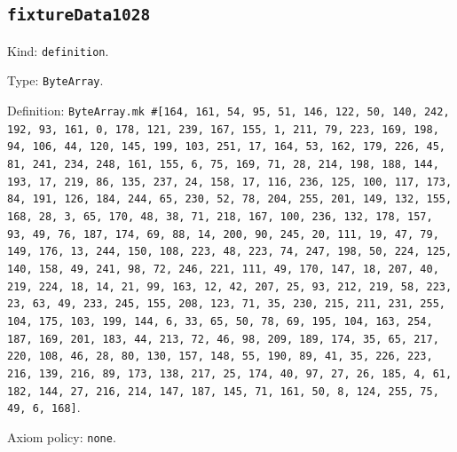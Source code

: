 \documentclass[11pt]{article}
\begin{document}
\subsection*{\texttt{fixtureData1028}}
\noindent Kind: \texttt{definition}.\par
\noindent Type: \texttt{ByteArray}.\par
\noindent Definition: \texttt{ByteArray.mk \#[164, 161, 54, 95, 51, 146, 122, 50, 140, 242, 192, 93, 161, 0, 178, 121, 239, 167, 155, 1, 211, 79, 223, 169, 198, 94, 106, 44, 120, 145, 199, 103, 251, 17, 164, 53, 162, 179, 226, 45, 81, 241, 234, 248, 161, 155, 6, 75, 169, 71, 28, 214, 198, 188, 144, 193, 17, 219, 86, 135, 237, 24, 158, 17, 116, 236, 125, 100, 117, 173, 84, 191, 126, 184, 244, 65, 230, 52, 78, 204, 255, 201, 149, 132, 155, 168, 28, 3, 65, 170, 48, 38, 71, 218, 167, 100, 236, 132, 178, 157, 93, 49, 76, 187, 174, 69, 88, 14, 200, 90, 245, 20, 111, 19, 47, 79, 149, 176, 13, 244, 150, 108, 223, 48, 223, 74, 247, 198, 50, 224, 125, 140, 158, 49, 241, 98, 72, 246, 221, 111, 49, 170, 147, 18, 207, 40, 219, 224, 18, 14, 21, 99, 163, 12, 42, 207, 25, 93, 212, 219, 58, 223, 23, 63, 49, 233, 245, 155, 208, 123, 71, 35, 230, 215, 211, 231, 255, 104, 175, 103, 199, 144, 6, 33, 65, 50, 78, 69, 195, 104, 163, 254, 187, 169, 201, 183, 44, 213, 72, 46, 98, 209, 189, 174, 35, 65, 217, 220, 108, 46, 28, 80, 130, 157, 148, 55, 190, 89, 41, 35, 226, 223, 216, 139, 216, 89, 173, 138, 217, 25, 174, 40, 97, 27, 26, 185, 4, 61, 182, 144, 27, 216, 214, 147, 187, 145, 71, 161, 50, 8, 124, 255, 75, 49, 6, 168]}.\par
\noindent Axiom policy: \texttt{none}.\par
\end{document}
